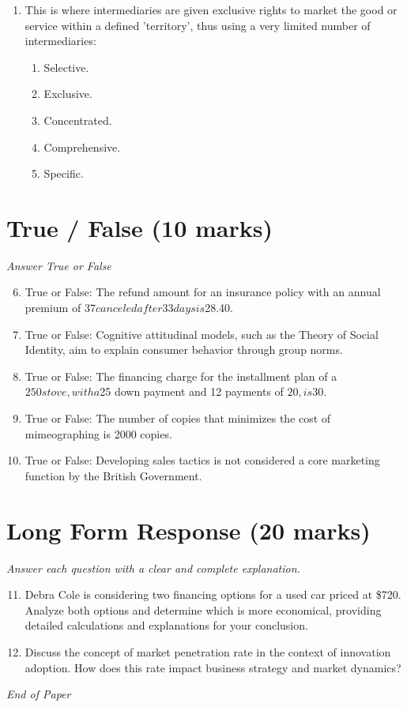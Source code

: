 \documentclass[12pt]{article}
\begin{document}
\begin{enumerate}[label=\arabic*.]
\begin{enumerate}[label=(\alph*)]
    \item \$790.92
    \item \$798
    \item \$810
    \item \$799.92
    \item \$785.92
\end{enumerate}
\item This is where intermediaries are given exclusive rights to market the good or service within a defined 'territory', thus using a very limited number of intermediaries:
\begin{enumerate}[label=(\alph*)]
    \item Selective.
    \item Exclusive.
    \item Concentrated.
    \item Comprehensive.
    \item Specific.
\end{enumerate}
\end{enumerate}

\section*{True / False (10 marks)}
\textit{Answer True or False}
\begin{enumerate}[label=\arabic*.]
\setcounter{enumi}{5}
\item True or False: The refund amount for an insurance policy with an annual premium of $37 canceled after 33 days is $28.40.
\item True or False: Cognitive attitudinal models, such as the Theory of Social Identity, aim to explain consumer behavior through group norms.
\item True or False: The financing charge for the installment plan of a $250 stove, with a $25 down payment and 12 payments of $20, is $30.
\item True or False: The number of copies that minimizes the cost of mimeographing is 2000 copies.
\item True or False: Developing sales tactics is not considered a core marketing function by the British Government.
\end{enumerate}

\section*{Long Form Response (20 marks)}
\textit{Answer each question with a clear and complete explanation.}
\begin{enumerate}[label=\arabic*.]
\setcounter{enumi}{10}
\item Debra Cole is considering two financing options for a used car priced at \$720. Analyze both options and determine which is more economical, providing detailed calculations and explanations for your conclusion.
\item Discuss the concept of market penetration rate in the context of innovation adoption. How does this rate impact business strategy and market dynamics?
\end{enumerate}

\vfill
\noindent\textit{End of Paper}
\end{document}
